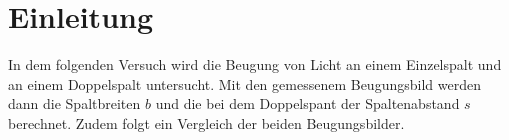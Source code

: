 \section{Einleitung}
\label{sec:einleitung}
In dem folgenden Versuch wird die Beugung von Licht an einem Einzelspalt und an einem Doppelspalt untersucht. Mit den gemessenem Beugungsbild
werden dann die Spaltbreiten $b$ und die bei dem Doppelspant der Spaltenabstand $s$ berechnet. Zudem folgt ein Vergleich der beiden Beugungsbilder.